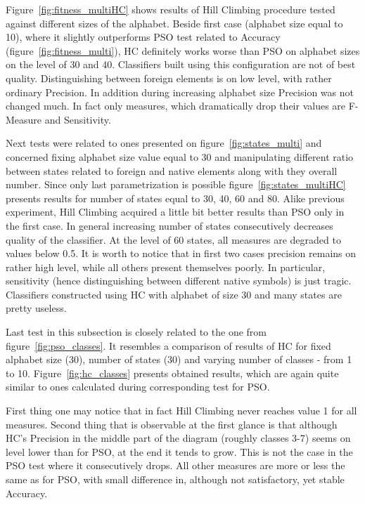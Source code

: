 \documentclass{mini}
\begin{document}
Figure~\ref{fig:fitness_multiHC} shows results of Hill Climbing procedure tested against different sizes of the alphabet. Beside first case (alphabet size equal to 10), where it slightly outperforms PSO test related to Accuracy (figure~\ref{fig:fitness_multi}), HC definitely works worse than PSO on alphabet sizes on the level of 30 and 40. Classifiers built using this configuration are not of best quality. Distinguishing between foreign elements is on low level, with rather ordinary Precision. In addition during increasing alphabet size Precision was not changed much. In fact only measures, which dramatically drop their values are F-Measure and Sensitivity.

\makeFigureFitnessMultiHC

Next tests were related to ones presented on figure~\ref{fig:states_multi} and concerned fixing alphabet size value equal to 30 and manipulating different ratio between states related to foreign and native elements along with they overall number. Since only last parametrization is possible figure~\ref{fig:states_multiHC} presents results for number of states equal to 30, 40, 60 and 80. Alike previous experiment, Hill Climbing acquired a little bit better results than PSO only in the first case. In general increasing number of states consecutively decreases quality of the classifier. At the level of 60 states, all measures are degraded to values below 0.5. It is worth to notice that in first two cases precision remains on rather high level, while all others present themselves poorly. In particular, sensitivity (hence distinguishing between different native symbols) is just tragic. Classifiers constructed using HC with alphabet of size 30 and many states are pretty useless.

\makeFigureStateConfigurationMultiHC

Last test in this subsection is closely related to the one from figure~\ref{fig:pso_classes}. It resembles a comparison of results of HC for fixed alphabet size (30), number of states (30) and varying number of classes - from 1 to 10. Figure~\ref{fig:hc_classes} presents obtained results, which are again quite similar to ones calculated during corresponding test for PSO.

First thing one may notice that in fact Hill Climbing never reaches value 1 for all measures. Second thing that is observable at the first glance is that although HC's Precision in the middle part of the diagram (roughly classes 3-7) seems on level lower than for PSO, at the end it tends to grow. This is not the case in the PSO test where it consecutively drops. All other measures are more or less the same as for PSO, with small difference in, although not satisfactory, yet stable Accuracy.
\end{document}
